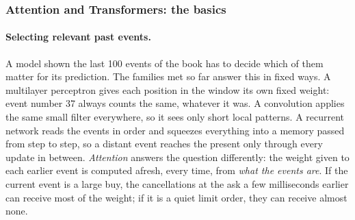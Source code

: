 \subsubsection{Attention and Transformers: the basics}
\label{sec:attn-intro}

\paragraph{Selecting relevant past events.} A model shown the last 100 events of the book has to decide which of them
matter for its prediction. The families met so far answer this in fixed ways. A multilayer perceptron gives each
position in the window its own fixed weight: event number 37 always counts the same, whatever it was. A
convolution applies the same small filter everywhere, so it sees only short local patterns. A recurrent network
reads the events in order and squeezes everything into a memory passed from step to step, so a distant event
reaches the present only through every update in between. \emph{Attention} answers the question differently:
the weight given to each earlier event is computed afresh, every time, from \emph{what the events are}. If the
current event is a large buy, the cancellations at the ask a few milliseconds earlier can receive most of the
weight; if it is a quiet limit order, they can receive almost none.

